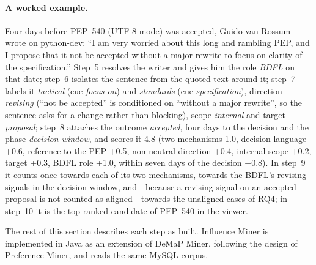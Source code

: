 \paragraph{A worked example.} Four days before PEP~540 (UTF-8 mode) was accepted, Guido van Rossum wrote on python-dev: ``I am very worried about this long and rambling PEP, and I propose that it not be accepted without a major rewrite to focus on clarity of the specification.'' Step~5 resolves the writer and gives him the role \emph{BDFL} on that date; step~6 isolates the sentence from the quoted text around it; step~7 labels it \emph{tactical} (cue \emph{focus on}) and \emph{standards} (cue \emph{specification}), direction \emph{revising} (``not be accepted'' is conditioned on ``without a major rewrite'', so the sentence asks for a change rather than blocking), scope \emph{internal} and target \emph{proposal}; step~8 attaches the outcome \emph{accepted}, four days to the decision and the phase \emph{decision window}, and scores it 4.8 (two mechanisms 1.0, decision language +0.6, reference to the PEP +0.5, non-neutral direction +0.4, internal scope +0.2, target +0.3, BDFL role +1.0, within seven days of the decision +0.8). In step~9 it counts once towards each of its two mechanisms, towards the BDFL's revising signals in the decision window, and---because a revising signal on an accepted proposal is not counted as aligned---towards the unaligned cases of RQ4; in step~10 it is the top-ranked candidate of PEP~540 in the viewer.

The rest of this section describes each step as built. Influence Miner is implemented in Java as an extension of DeMaP Miner, following the design of Preference Miner, and reads the same MySQL corpus.
